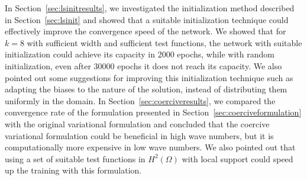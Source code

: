 In Section~\ref{sec:lsinitresults}, we investigated the initialization method described in Section~\ref{sec:lsinit} and showed that a suitable initialization technique could effectively improve the convergence speed of the network. We showed that for $k=8$ with sufficient width and sufficient test functions, the network with suitable initialization could achieve its capacity in 2000 epochs, while with random initialization, even after 30000 epochs it does not reach its capacity. We also pointed out some suggestions for improving this initialization technique such as adapting the biases to the nature of the solution, instead of distributing them uniformly in the domain. In Section~\ref{sec:coerciveresults}, we compared the convergence rate of the formulation presented in Section~\ref{sec:coerciveformulation} with the original variational formulation and concluded that the coercive variational formulation could be beneficial in high wave numbers, but it is computationally more expensive in low wave numbers. We also pointed out that using a set of suitable test functions in $H^2(\Omega)$ with local support could speed up the training with this formulation.

